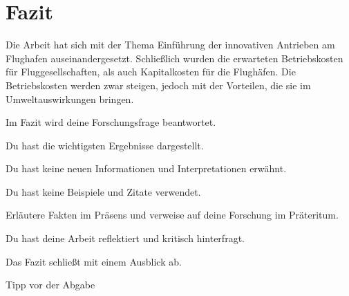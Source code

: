 \chapter{Fazit}
\label{ch:Fazit}
Die Arbeit hat sich mit der Thema Einführung der innovativen Antrieben am Flughafen auseinandergesetzt. Schließlich wurden die
erwarteten Betriebskosten für Fluggesellschaften, als auch Kapitalkosten für die Flughäfen. Die Betriebskosten werden zwar steigen,
jedoch mit der Vorteilen, die sie im Umweltauswirkungen bringen.



Im Fazit wird deine Forschungsfrage beantwortet.

Du hast die wichtigsten Ergebnisse dargestellt.

Du hast keine neuen Informationen und Interpretationen erwähnt.

Du hast keine Beispiele und Zitate verwendet.

Erläutere Fakten im Präsens und verweise auf deine Forschung im Präteritum.

Du hast deine Arbeit reflektiert und kritisch hinterfragt.

Das Fazit schließt mit einem Ausblick ab.

Tipp vor der Abgabe